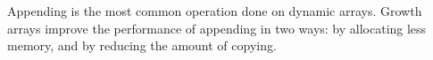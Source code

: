 \HdrDescription

Appending is the most common operation done on dynamic arrays. Growth arrays improve the performance of appending in two ways: by allocating less memory, and by reducing the amount of copying.